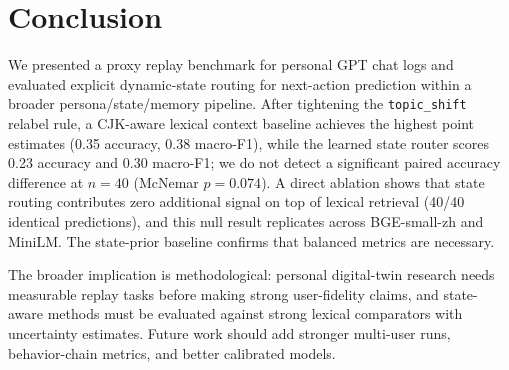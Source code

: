\section{Conclusion}

We presented a proxy replay benchmark for personal GPT chat logs and evaluated explicit dynamic-state routing for next-action prediction within a broader persona/state/memory pipeline. After tightening the \texttt{topic\_shift} relabel rule, a CJK-aware lexical context baseline achieves the highest point estimates (0.35 accuracy, 0.38 macro-F1), while the learned state router scores 0.23 accuracy and 0.30 macro-F1; we do not detect a significant paired accuracy difference at $n=40$ (McNemar $p=0.074$). A direct ablation shows that state routing contributes zero additional signal on top of lexical retrieval (40/40 identical predictions), and this null result replicates across BGE-small-zh and MiniLM. The state-prior baseline confirms that balanced metrics are necessary.

The broader implication is methodological: personal digital-twin research needs measurable replay tasks before making strong user-fidelity claims, and state-aware methods must be evaluated against strong lexical comparators with uncertainty estimates. Future work should add stronger multi-user runs, behavior-chain metrics, and better calibrated models.
